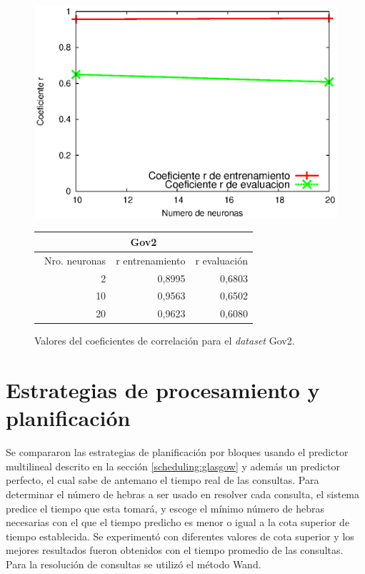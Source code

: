 \begin{figure}[tp]
  \begin{minipage}[][][b]{0.5\linewidth}
    \centering
    \includegraphics[width=\linewidth]{images/gov2RN.eps}
  \end{minipage}%
\begin{tabular}{|r|r|r|}
\hline
\multicolumn{ 3}{|c|}{Gov2} \\ \hline
\multicolumn{1}{|l|}{\ Nro. neuronas} & \multicolumn{1}{l|}{r entrenamiento} & \multicolumn{1}{l|}{r evaluación} \\ \hline
2 & 0,8995 & 0,6803 \\ \hline
10 & 0,9563 & 0,6502 \\ \hline
20 & 0,9623 & 0,6080 \\ \hline
\end{tabular}

\caption{Valores del coeficientes de correlación para el \textit{dataset} Gov2.}
\label{fig:gov2RN}
\end{figure}


\section{Estrategias de procesamiento y planificación}
\label{evaluacionexperimental:estrategiasscheduling}
Se compararon las estrategias de planificación por bloques \citep{Ye:2007} usando el predictor multilineal descrito en la sección \ref{scheduling:glasgow} y además un predictor perfecto, el cual sabe de antemano el tiempo real de las consultas. Para determinar el número de hebras a ser usado en resolver cada consulta, el sistema predice el tiempo que esta tomará, y escoge el mínimo número de hebras necesarias con el que el tiempo predicho es menor o igual a la cota superior de tiempo establecida. Se experimentó con diferentes valores de cota superior y los mejores resultados fueron obtenidos con el tiempo promedio de las consultas. Para la resolución de consultas se utilizó el método Wand.

